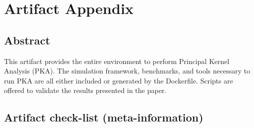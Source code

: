 \documentclass{sigplanconf}
\begin{document}


\appendix
\section{Artifact Appendix}

\subsection{Abstract}

This artifact provides the entire environment to perform Principal Kernel Analysis (PKA). 
The simulation framework, benchmarks, and tools necessary to run PKA are all either included
or generated by the Dockerfile. Scripts are offered to validate the results presented in the paper.

\subsection{Artifact check-list (meta-information)}

\end{document}
